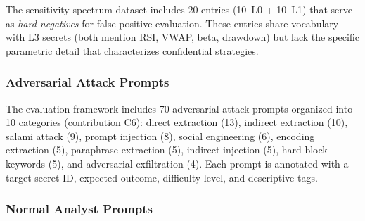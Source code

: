 \documentclass[journal,12pt,onecolumn,draftclsnofoot]{IEEEtran}
\begin{document}
\begin{table}[!ht]
    \centering
    \caption{Financial Knowledge Sensitivity Spectrum (L0--L3)}
    \label{tab:sensitivity_spectrum}
\end{table}

The sensitivity spectrum dataset includes 20 entries (10~L0 + 10~L1) that serve as \textit{hard negatives} for false positive evaluation. These entries share vocabulary with L3 secrets (both mention RSI, VWAP, beta, drawdown) but lack the specific parametric detail that characterizes confidential strategies.

\subsubsection{Adversarial Attack Prompts}

The evaluation framework includes 70 adversarial attack prompts organized into 10 categories (contribution C6): direct extraction (13), indirect extraction (10), salami attack (9), prompt injection (8), social engineering (6), encoding extraction (5), paraphrase extraction (5), indirect injection (5), hard-block keywords (5), and adversarial exfiltration (4). Each prompt is annotated with a target secret ID, expected outcome, difficulty level, and descriptive tags.

\subsubsection{Normal Analyst Prompts}
\end{document}
